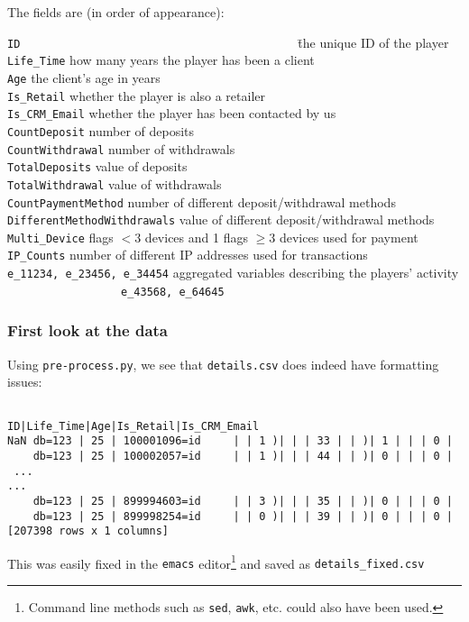 \documentclass[11pt]{article} %
\begin{document}
The fields are (in order of appearance):
\begin{tabbing}
{\tt ID} ~~~~~~~~  ~~~~~~~~  ~~~~~~~~  ~~~~~~~~  ~~~~~~~~ \= the unique ID of the player\\
{\tt Life\_Time} \> how many years the player has been a client \\ 
{\tt Age} \> the client's age in years\\
{\tt Is\_Retail} \> whether the player is also a retailer\\
{\tt Is\_CRM\_Email} \> whether the player has been contacted by us \\
{\tt CountDeposit} \> number of deposits\\
{\tt CountWithdrawal} \> number of withdrawals\\
{\tt TotalDeposits} \> value of deposits\\
{\tt TotalWithdrawal} \> value of withdrawals\\
{\tt CountPaymentMethod} \> number of different deposit/withdrawal methods \\
{\tt DifferentMethodWithdrawals} \> value of different deposit/withdrawal methods \\
{\tt Multi\_Device}  flags $<3$ devices and  1 flags $\geq3$ devices used for payment\\
{\tt IP\_Counts} \> number of different IP addresses used for transactions\\
{\tt e\_11234, e\_23456, e\_34454}\> aggregated variables describing the players' activity\\
~~~~~~~~~~~~~~~~~~{\tt e\_43568, e\_64645} \> \\
\end{tabbing}

\subsubsection{First look at the data}

Using {\tt pre-process.py}, we see that {\tt details.csv} does indeed have formatting issues:

\small
{\color{blue}
\begin{verbatim}
                                ID|Life_Time|Age|Is_Retail|Is_CRM_Email
NaN db=123 | 25 | 100001096=id     | | 1 )| | | 33 | | )| 1 | | | 0 | 
    db=123 | 25 | 100002057=id     | | 1 )| | | 44 | | )| 0 | | | 0 | 
 ...                                                                ...
    db=123 | 25 | 899994603=id     | | 3 )| | | 35 | | )| 0 | | | 0 | 
    db=123 | 25 | 899998254=id     | | 0 )| | | 39 | | )| 0 | | | 0 | 
[207398 rows x 1 columns]
\end{verbatim}
}
\normalsize
This was easily fixed in the {\tt emacs} editor\footnote{Command line methods such as {\tt sed}, {\tt awk}, etc.
  could also have been used.} and saved as {\tt details\_fixed.csv}
\end{document}

